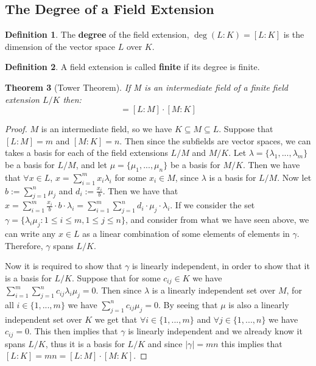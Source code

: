\documentclass[12pt]{article}
\newtheorem{theorem}{Theorem}
\theoremstyle{definition}
\newtheorem{definition}[theorem]{Definition}
\begin{document}
\subsection{The Degree of a Field Extension}
\begin{definition}
    The \textbf{degree} of the field extension, $\deg(L:K)=[L:K]$ is the dimension of the vector space $L$ over $K$.
\end{definition}
\begin{definition}
    A field extension is called \textbf{finite} if its degree is finite. 
\end{definition}
\begin{theorem}[Tower Theorem] \label{thm:tower-theorem}
    If M is an intermediate field of a finite field extension $L/K$ then:
\begin{equation*}
    [L:K] = [L:M]\cdot[M:K]
\end{equation*}
\end{theorem}
\begin{proof}
$M$ is an intermediate field, so we have $K \subseteq M \subseteq L$. Suppose that $[L:M]=m$ and $[M:K]=n$. Then since the subfields are vector spaces, we can takes a basis for each of the field extensions $L/M$ and $M/K$.
Let $\lambda = \{\lambda_1,...,\lambda_m\}$ be a basis for $L/M$, and let $\mu = \{\mu_1,...,\mu_n\}$ be a basis for $M/K$. Then we have that $\forall x \in L$, $x = \sum^m_{i=1}x_i\lambda_i$ for some $x_i \in M$, since $\lambda$ is a basis for $L/M$. Now let $b:=\sum^n_{j=1}\mu_j$ and $d_i:=\frac{x_i}{b}$. Then we have that $x=\sum^m_{i=1}\frac{x_i}{b}\cdot b \cdot \lambda_i = \sum^m_{i=1}\sum^n_{j=1}d_i\cdot \mu_j \cdot \lambda_i$. If we consider the set $\gamma=\{\lambda_i\mu_j : 1\leq i \leq m, 1\leq j \leq n\}$, and consider from what we have seen above, we can write any $x \in L$ as a linear combination of some elements of elements in $\gamma$. Therefore, $\gamma$ spans $L/K$.

Now it is required to show that $\gamma$ is linearly independent, in order to show that it is a basis for $L/K$. Suppose that for some $c_{ij} \in K$ we have $\sum^m_{i=1} \sum^n_{j=1} c_{ij}\lambda_i\mu_j = 0 $. Then since $\lambda$ is a linearly independent set over $M$, for all $i \in \{1,...,m\}$ we have $\sum^n_{j=1} c_{ij}\mu_j = 0 $. By seeing that $\mu$ is also a linearly independent set over $K$ we get that $\forall i \in \{1,...,m\}$ and $\forall j \in \{1,...,n\}$ we have $c_{ij} = 0$. This then implies that $\gamma$ is linearly independent and we already know it spans $L/K$, thus it is a basis for $L/K$ and since $|\gamma|=mn$ this implies that $[L:K] = mn = [L:M]\cdot[M:K]$.

\end{proof}
\end{document}
